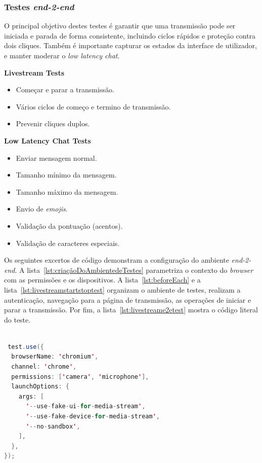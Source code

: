 \subsubsection{Testes \textit{end-2-end}}

O principal objetivo destes testes é garantir que uma transmissão pode ser iniciada e parada de forma consistente, incluindo ciclos rápidos e proteção contra dois cliques. Também é importante capturar os estados da interface de utilizador, e manter moderar o \textit{low latency chat}.

\textbf{Livestream Tests}
    \begin{itemize}
      \item Começar e parar a transmissão.
      \item Vários ciclos de começo e termino de transmissão.
      \item Prevenir cliques duplos.
    \end{itemize}
    
\textbf{Low Latency Chat Tests}
    \begin{itemize}
      \item Enviar mensagem normal. 
      \item Tamanho mínimo da mensagem.
      \item Tamanho máximo da mensagem.
      \item Envio de \textit{emojis}.
      \item Validação da pontuação (acentos).
      \item Validação de caracteres especiais.
    \end{itemize}

Os seguintes excertos de código demonstram a configuração do ambiente \textit{end-2-end}. A lista~\ref{lst:criaçãoDoAmbientedeTestes} parametriza o contexto do \textit{browser} com as permissões e os dispositivos. A lista~\ref{lst:beforeEach} e a lista~\ref{lst:livestreamstartstoptest} organizam o ambiente de testes, realizam a autenticação, navegação para a página de transmissão, as operações de iniciar e parar a transmissão. Por fim, a lista~\ref{lst:livestreame2etest} mostra o código literal do teste.


\begin{lstlisting}[language=Java, caption={Criação do ambiente de testes}, label={lst:criaçãoDoAmbientedeTestes}]
 
 test.use({
  browserName: 'chromium',
  channel: 'chrome',
  permissions: ['camera', 'microphone'],
  launchOptions: {
    args: [
      '--use-fake-ui-for-media-stream',
      '--use-fake-device-for-media-stream',
      '--no-sandbox',
    ],
  },
});

\end{lstlisting}


